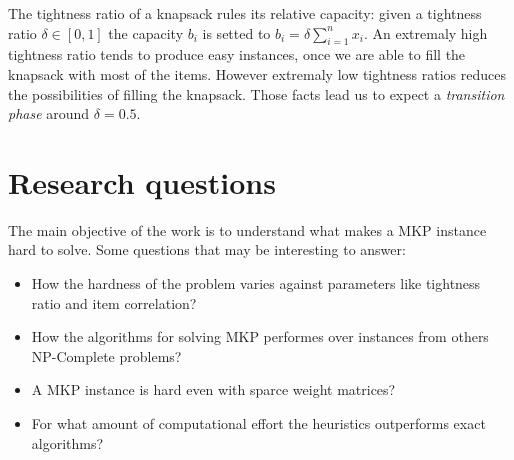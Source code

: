 \documentclass{article}
\begin{document}
The tightness ratio of a knapsack rules its relative capacity:
given a tightness ratio $\delta \in [0,1]$ the capacity $b_i$ is setted to
$b_i = \delta \sum_{i=1}^n x_i$. 
An extremaly high tightness ratio tends to produce easy instances, once we
are able to fill the knapsack with most of the items.
However extremaly low tightness ratios reduces the possibilities of filling the
knapsack.
Those facts lead us to expect a {\it transition phase} around $ \delta = 0.5$.


\section{Research questions}
\label{questions}

The main objective of the work is to understand what makes a MKP instance hard
to solve.
Some questions that may be interesting to answer:
\begin{itemize}
  \item{How the hardness of the problem varies against parameters like
    tightness ratio and item correlation?}
  \item{How the algorithms for solving MKP performes over instances from
    others NP-Complete problems?}
  \item{A MKP instance is hard even with sparce weight matrices?}
  \item{For what amount of computational effort the heuristics outperforms
    exact algorithms?}
\end{itemize}



\end{document}
